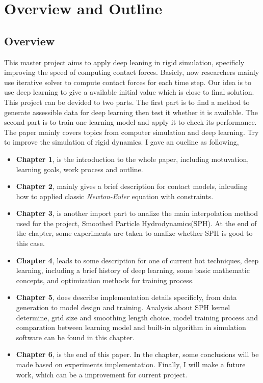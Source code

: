 \section{Overview and Outline}
    \subsection{Overview}
        This master project aims to apply deep leaning in rigid simulation, specificly improving the speed of computing contact forces. Basicly, now researchers mainly use iterative solver to compute contact forces for each time step. Our idea is to use deep learning to give a available initial value which is close to final solution. This project can be devided to two parts. The first part is to find a method to generate assessible data for deep learning then test it whether it is available. The second part is to train one learning model and apply it to check its performance. \\

        The paper mainly covers topics from computer simulation and deep learning. Try to improve the simulation of rigid dynamics. I gave an oueline as following,
    \begin{itemize}
        \item \textbf{Chapter 1}, is the introduction to the whole paper, including motuvation, learning goals, work process and outline. 
        \item \textbf{Chapter 2}, mainly gives a brief description for contact models, inlcuding how to applied classic \textit{Newton-Euler} equation with constraints. 
        \item \textbf{Chapter 3}, is another import part to analize the main interpolation method used for the project, Smoothed Particle Hydrodynamics(SPH). At the end of the chapter, some experiments are taken to analize whether SPH is good to this case.
        \item \textbf{Chapter 4}, leads to some description for one of current hot techniques, deep learning, including a brief history of deep learning, some basic mathematic concepts, and optimization methods for training process.
        \item \textbf{Chapter 5}, does describe implementation details specificly, from data generation to model design and training. Analysis about SPH kernel determine, grid size and smoothing length choice, model training process and comparation between learning model and built-in algorithm in simulation software can be found in this chapter. 
        \item \textbf{Chapter 6}, is the end of this paper. In the chapter, some conclusions will be made based on experiments implementation. Finally, I will make a future work, which can be a improvement for current project.
    \end{itemize}